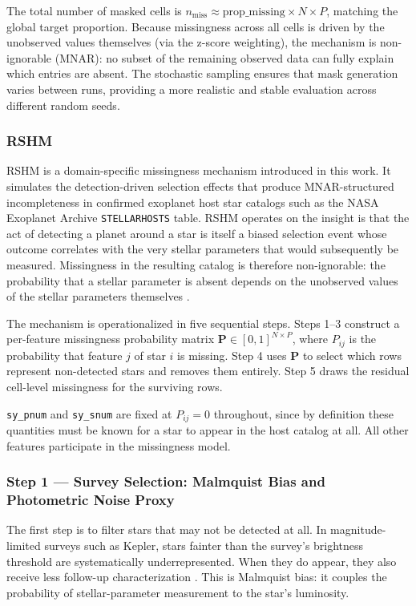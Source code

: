 \documentclass[preprint,longauthor,twocolumn]{aastex631}
\begin{document}
The total number of masked cells is $n_{\text{miss}} \approx \text{prop\_missing} \times N \times P$, matching the global target proportion. Because missingness across all cells is driven by the unobserved values themselves (via the z-score weighting), the mechanism is non-ignorable (MNAR): no subset of the remaining observed data can fully explain which entries are absent. The stochastic sampling ensures that mask generation varies between runs, providing a more realistic and stable evaluation across different random seeds.

\subsubsection{RSHM}

RSHM is a domain-specific missingness mechanism introduced in this work. It simulates the detection-driven selection effects that produce MNAR-structured incompleteness in confirmed exoplanet host star catalogs such as the NASA Exoplanet Archive \verb|STELLARHOSTS| table. RSHM operates on the insight is that the act of detecting a planet around a star is itself a biased selection event whose outcome correlates with the very stellar parameters that would subsequently be measured. Missingness in the resulting catalog is therefore non-ignorable: the probability that a stellar parameter is absent depends on the unobserved values of the stellar parameters themselves \citep{hsuOccurrenceRatesPlanets2019}.

The mechanism is operationalized in five sequential steps. Steps 1--3 construct a per-feature missingness probability matrix $\mathbf{P} \in [0,1]^{N \times P}$, where $P_{ij}$ is the probability that feature $j$ of star $i$ is missing. Step 4 uses $\mathbf{P}$ to select which rows represent non-detected stars and removes them entirely. Step 5 draws the residual cell-level missingness for the surviving rows.

\texttt{sy\_pnum} and \texttt{sy\_snum} are fixed at $P_{ij} = 0$ throughout, since by definition these quantities must be known for a star to appear in the host catalog at all. All other features participate in the missingness model.

\subsubsection*{Step 1 --- Survey Selection: Malmquist Bias and Photometric Noise Proxy}

The first step is to filter stars that may not be detected at all. In magnitude-limited surveys such as Kepler, stars fainter than the survey's brightness threshold are systematically underrepresented. When they do appear, they also receive less follow-up characterization \citep{gaidosOBJECTSKEPLERSMIRROR2012}. This is Malmquist bias: it couples the probability of stellar-parameter measurement to the star's luminosity.
\end{document}
